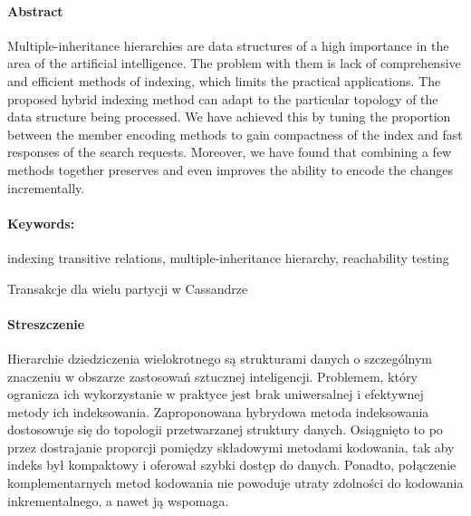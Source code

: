 \newpage
\paragraph{Abstract} Multiple-inheritance hierarchies are data structures of a high importance in the area of
the artificial intelligence. The problem with them is lack of comprehensive and efficient methods of indexing, which
limits the practical applications. The proposed hybrid indexing method can adapt to the particular topology of the data
structure being processed. We have achieved this by tuning the proportion between the member encoding methods to gain
compactness of the index and fast responses of the search requests. Moreover, we have found that combining a few methods
together preserves and even improves the ability to encode the changes incrementally.


\paragraph{Keywords:} indexing transitive relations, multiple-inheritance hierarchy, reachability testing

\begin{center}
\vspace*{\baselineskip}
    \fontsize{15pt}{18pt}\selectfont
      Transakcje dla wielu partycji w Cassandrze  \\
\end{center}
\paragraph{Streszczenie} Hierarchie dziedziczenia wielokrotnego są strukturami danych o szczególnym znaczeniu w
obszarze zastosowań sztucznej inteligencji. Problemem, który ogranicza ich wykorzystanie w praktyce jest brak
uniwersalnej i efektywnej metody ich indeksowania. Zaproponowana hybrydowa metoda indeksowania dostosowuje się do
topologii przetwarzanej struktury danych. Osiągnięto to po przez dostrajanie proporcji pomiędzy składowymi metodami
kodowania, tak aby indeks był kompaktowy i oferował szybki dostęp do danych. Ponadto, połączenie komplementarnych metod
kodowania nie powoduje utraty zdolności do kodowania inkrementalnego, a nawet ją wspomaga.

